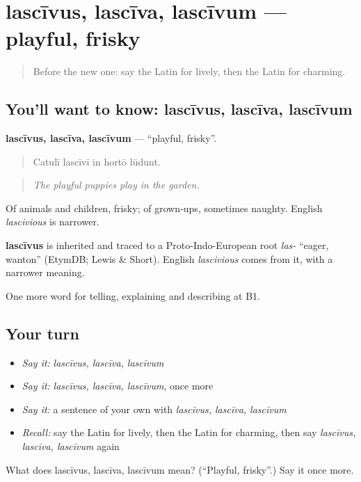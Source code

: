 \section[lascīvus, lascīva, lascīvum]{lascīvus, lascīva, lascīvum — playful, frisky}

\label{lesson:LA-C503-lascivus}



\begin{quote}
Before the new one: say the Latin for lively, then the Latin for charming.
\end{quote}

\subsection*{You'll want to know: lascīvus, lascīva, lascīvum}
\textbf{lascīvus, lascīva, lascīvum} — \textquotedblleft{}playful, frisky\textquotedblright{}.

\begin{quote}
Catulī lascīvī in hortō lūdunt.
\end{quote}

\begin{quote}
\emph{The playful puppies play in the garden.}
\end{quote}

Of animals and children, frisky; of grown-ups, sometimes naughty. English \emph{lascivious} is narrower.

\begin{cousinweb}
\textbf{lascīvus} is inherited and traced to a Proto-Indo-European root \emph{las-} \textquotedblleft{}eager, wanton\textquotedblright{} (EtymDB; Lewis \& Short). English \emph{lascivious} comes from it, with a narrower meaning.
\end{cousinweb}

\begin{grammarlens}[title={What you've built}]
One more word for telling, explaining and describing at B1.
\end{grammarlens}

\subsection*{Your turn}
\begin{itemize}
\raggedright
  \item \emph{Say it:} \emph{lascīvus, lascīva, lascīvum}
  \item \emph{Say it:} \emph{lascīvus, lascīva, lascīvum}, once more
  \item \emph{Say it:} a sentence of your own with \emph{lascīvus, lascīva, lascīvum}
  \item \emph{Recall:} say the Latin for lively, then the Latin for charming, then say \emph{lascīvus, lascīva, lascīvum} again
\end{itemize}

\begin{tcolorbox}[breakable,colback=teal!4,colframe=teal!35!black,title={Before you move on}]
What does lascīvus, lascīva, lascīvum mean? (\textquotedblleft{}Playful, frisky\textquotedblright{}.) Say it once more.
\end{tcolorbox}
